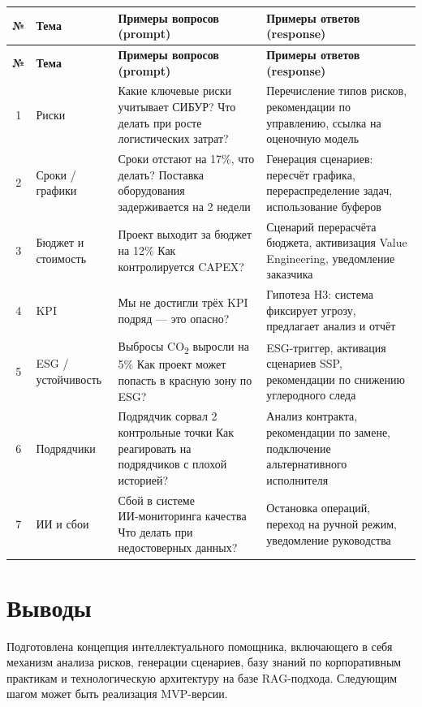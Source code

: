 \documentclass[12pt]{article}
\begin{document}
\begin{longtable}{|c|p{3.5cm}|p{5.2cm}|p{5.2cm}|}
\hline
\textbf{№} & \textbf{Тема} & \textbf{Примеры вопросов (prompt)} & \textbf{Примеры ответов (response)} \\
\hline
\endfirsthead
\hline
\textbf{№} & \textbf{Тема} & \textbf{Примеры вопросов (prompt)} & \textbf{Примеры ответов (response)} \\
\hline
\endhead

1 & Риски & Какие ключевые риски учитывает СИБУР? \newline Что делать при росте логистических затрат? & Перечисление типов рисков, рекомендации по управлению, ссылка на оценочную модель \\
\hline

2 & Сроки / графики & Сроки отстают на 17\%, что делать? \newline Поставка оборудования задерживается на 2 недели & Генерация сценариев: пересчёт графика, перераспределение задач, использование буферов \\
\hline

3 & Бюджет и стоимость & Проект выходит за бюджет на 12\% \newline Как контролируется CAPEX? & Сценарий перерасчёта бюджета, активизация Value Engineering, уведомление заказчика \\
\hline

4 & KPI & Мы не достигли трёх KPI подряд — это опасно? & Гипотеза H3: система фиксирует угрозу, предлагает анализ и отчёт \\
\hline

5 & ESG / устойчивость & Выбросы CO\textsubscript{2} выросли на 5\% \newline Как проект может попасть в красную зону по ESG? & ESG-триггер, активация сценариев SSP, рекомендации по снижению углеродного следа \\
\hline

6 & Подрядчики & Подрядчик сорвал 2 контрольные точки \newline Как реагировать на подрядчиков с плохой историей? & Анализ контракта, рекомендации по замене, подключение альтернативного исполнителя \\
\hline

7 & ИИ и сбои & Сбой в системе ИИ‑мониторинга качества \newline Что делать при недостоверных данных? & Остановка операций, переход на ручной режим, уведомление руководства \\
\hline

\end{longtable}


\section{Выводы}
Подготовлена концепция интеллектуального помощника, включающего в себя механизм анализа рисков, генерации сценариев, базу знаний по корпоративным практикам и технологическую архитектуру на базе RAG-подхода. Следующим шагом может быть реализация MVP-версии.
\end{document}
